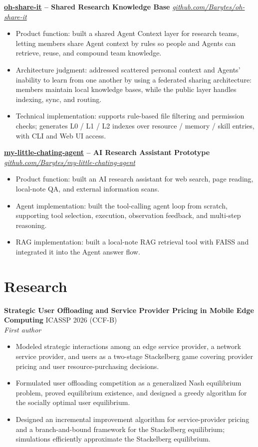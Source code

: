 \documentclass[10pt,letterpaper]{article}
\newcommand{\resumeItem}[1]{\item #1}
\newcommand{\resumeSubheading}[4]{
  \textbf{#1} \hfill #2 \\
  \textit{#3} \hfill \textit{#4}
}
\newcommand{\projectHeading}[2]{
  \textbf{#1} \hfill \textit{#2}
}
\begin{document}
\projectHeading{\href{https://github.com/Barytes/oh-share-it}{oh-share-it} -- Shared Research Knowledge Base}{\href{https://github.com/Barytes/oh-share-it}{github.com/Barytes/oh-share-it}}
\begin{itemize}
  \resumeItem{Product function: built a shared Agent Context layer for research teams, letting members share Agent context by rules so people and Agents can retrieve, reuse, and compound team knowledge.}
  \resumeItem{Architecture judgment: addressed scattered personal context and Agents' inability to learn from one another by using a federated sharing architecture: members maintain local knowledge bases, while the public layer handles indexing, sync, and routing.}
  \resumeItem{Technical implementation: supports rule-based file filtering and permission checks; generates L0 / L1 / L2 indexes over resource / memory / skill entries, with CLI and Web UI access.}
\end{itemize}

\projectHeading{\href{https://github.com/Barytes/my-little-chating-agent}{my-little-chating-agent} -- AI Research Assistant Prototype}{\href{https://github.com/Barytes/my-little-chating-agent}{github.com/Barytes/my-little-chating-agent}}
\begin{itemize}
  \resumeItem{Product function: built an AI research assistant for web search, page reading, local-note QA, and external information scans.}
  \resumeItem{Agent implementation: built the tool-calling agent loop from scratch, supporting tool selection, execution, observation feedback, and multi-step reasoning.}
  \resumeItem{RAG implementation: built a local-note RAG retrieval tool with FAISS and integrated it into the Agent answer flow.}
\end{itemize}

\section{Research}

\resumeSubheading{Strategic User Offloading and Service Provider Pricing in Mobile Edge Computing}{ICASSP 2026 (CCF-B)}
{First author}{}
\begin{itemize}
  \resumeItem{Modeled strategic interactions among an edge service provider, a network service provider, and users as a two-stage Stackelberg game covering provider pricing and user resource-purchasing decisions.}
  \resumeItem{Formulated user offloading competition as a generalized Nash equilibrium problem, proved equilibrium existence, and designed a greedy algorithm for the socially optimal user equilibrium.}
  \resumeItem{Designed an incremental improvement algorithm for service-provider pricing and a branch-and-bound framework for the Stackelberg equilibrium; simulations efficiently approximate the Stackelberg equilibrium.}
\end{itemize}
\end{document}
